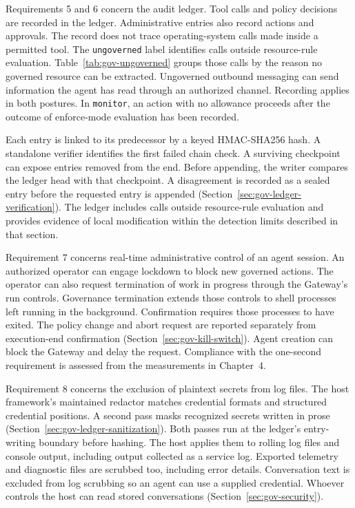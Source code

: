 {\color{red}Requirements 5 and 6 concern the audit ledger. Tool calls and policy
decisions are recorded in the ledger. Administrative entries also record
actions and approvals. The record does not trace operating-system calls made
inside a permitted tool. The \texttt{ungoverned} label identifies calls outside
resource-rule evaluation. Table~\ref{tab:gov-ungoverned} groups those calls by
the reason no governed resource can be extracted. Ungoverned outbound
messaging can send information the agent has read through an authorized
channel. Recording applies in both postures. In \texttt{monitor}, an action
with no allowance proceeds after the outcome of enforce-mode evaluation has
been recorded.

Each entry is linked to its predecessor by a keyed HMAC-SHA256 hash. A
standalone verifier identifies the first failed chain check. A surviving
checkpoint can expose entries removed from the end. Before appending, the
writer compares the ledger head with that checkpoint. A disagreement is
recorded as a sealed entry before the requested entry is appended
(Section~\ref{sec:gov-ledger-verification}). The ledger includes calls outside
resource-rule evaluation and provides evidence of local modification within
the detection limits described in that section.}

{\color{red}Requirement 7 concerns real-time administrative control of an agent
session. An authorized operator can engage lockdown to block new governed
actions. The operator can also request termination of work in progress through
the Gateway's run controls. Governance termination extends those controls to
shell processes left running in the background. Confirmation requires those
processes to have exited. The policy change and abort request are reported
separately from execution-end confirmation
(Section~\ref{sec:gov-kill-switch}). Agent creation can block the Gateway and
delay the request. Compliance with the one-second requirement is assessed
from the measurements in Chapter~4.}

{\color{red}Requirement 8 concerns the exclusion of plaintext secrets from log
files. The host framework's maintained redactor matches credential formats
and structured credential positions. A second pass masks recognized secrets
written in prose (Section~\ref{sec:gov-ledger-sanitization}). Both passes run
at the ledger's entry-writing boundary before hashing. The host applies them
to rolling log files and console output, including output collected as a
service log. Exported telemetry and diagnostic files are scrubbed too,
including error details. Conversation text is excluded from log scrubbing
so an agent can use a supplied credential. Whoever controls the host can read
stored conversations (Section~\ref{sec:gov-security}).}

